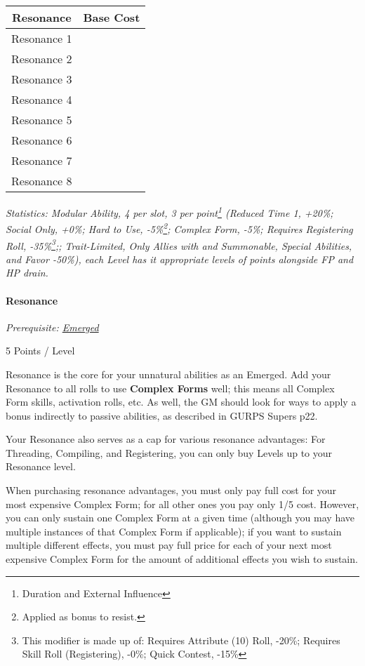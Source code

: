 \begin{multicols*}{3}
	
	\begin{center}
		\begin{tabular}{|c|c|}
			\hline
			Resonance & Base Cost\\
			\hline
			\hline
			Resonance 1 &  \\
			Resonance 2 &  \\
			Resonance 3 &  \\
			Resonance 4 &  \\
			Resonance 5 &  \\
			Resonance 6 &  \\
			Resonance 7 &  \\
			Resonance 8 &  \\
			\hline
		\end{tabular}
	\end{center}
		
	
	\textit{\textcolor{OliveGreen}{Statistics: Modular Ability, 4 per slot, 3 per point\footnote{Duration and External Influence} (Reduced Time 1, +20\%; Social Only, +0\%; Hard to Use, -5\%\footnote{Applied as bonus to resist.}; Complex Form, -5\%; Requires Registering Roll, -35\%\footnote{This modifier is made up of: Requires Attribute (10) Roll, -20\%; Requires Skill Roll (Registering), -0\%; Quick Contest, -15\%};; Trait-Limited, Only Allies with and Summonable, Special Abilities, and Favor -50\%), each Level has it appropriate levels of points alongside FP and HP drain.}}
	
	\paragraph{Resonance}
	\textit{Prerequisite: \hyperref[emerged]{Emerged}}
	\begin{flushright}
		5 Points / Level
	\end{flushright}
	
	Resonance is the core for your unnatural abilities as an Emerged. Add your Resonance to all rolls to use \textbf{Complex Forms} well; this means all Complex Form skills, activation rolls, etc. As well, the GM should look for ways to apply a bonus indirectly to passive abilities, as described in GURPS Supers p22.
	
	Your Resonance also serves as a cap for various resonance advantages: For Threading, Compiling, and Registering, you can only buy Levels up to your Resonance level.
	
	When purchasing resonance advantages, you must only pay full cost for your most expensive Complex Form; for all other ones you pay only 1/5 cost. However, you can only sustain one Complex Form at a given time (although you may have multiple instances of that Complex Form if applicable); if you want to sustain multiple different effects, you must pay full price for each of your next most expensive Complex Form for the amount of additional effects you wish to sustain.
	

\end{multicols*}
